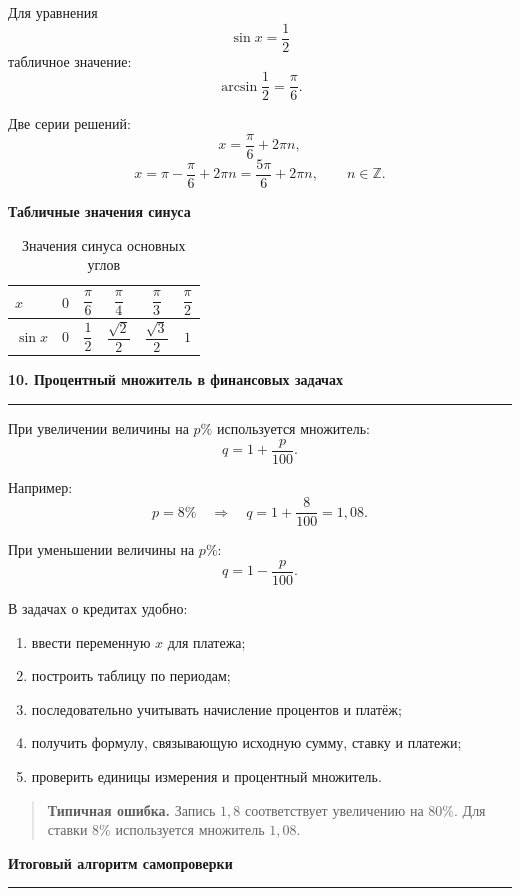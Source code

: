 \documentclass[a4paper,12pt]{article}
\newcommand{\topic}[1]{%
  \par\bigskip
  {\Large\bfseries\color{darkaccent}#1\par}
  \vspace{0.2em}
  {\color{accent}\rule{\linewidth}{0.7pt}}
  \vspace{0.55em}
}
\newcommand{\subtopic}[1]{%
  \par\medskip
  {\large\bfseries\color{darkaccent}#1\par}
  \vspace{0.2em}
}
\newcommand{\warning}[1]{%
  \begin{quote}
    \color{darkaccent}\textbf{Типичная ошибка.}\;
    \color{textgray}#1
  \end{quote}
}
\begin{document}
Для уравнения
\[
\sin x=\frac12
\]
табличное значение:
\[
\arcsin\frac12=\frac\pi6.
\]

Две серии решений:
\[
x=\frac\pi6+2\pi n,
\]
\[
x=\pi-\frac\pi6+2\pi n
=
\frac{5\pi}6+2\pi n,
\qquad n\in\mathbb Z.
\]

\subtopic{Табличные значения синуса}

\begin{table}[htbp]
  \caption{Значения синуса основных углов}
  \centering
  \begin{tabularx}{\linewidth}{@{}Xccccc@{}}
    \toprule
    \(x\) &
    \(0\) &
    \(\dfrac\pi6\) &
    \(\dfrac\pi4\) &
    \(\dfrac\pi3\) &
    \(\dfrac\pi2\) \\
    \midrule
    \(\sin x\) &
    \(0\) &
    \(\dfrac12\) &
    \(\dfrac{\sqrt2}{2}\) &
    \(\dfrac{\sqrt3}{2}\) &
    \(1\) \\
    \bottomrule
  \end{tabularx}
\end{table}

\topic{10. Процентный множитель в финансовых задачах}

При увеличении величины на \(p\%\) используется множитель:
\[
q=1+\frac{p}{100}.
\]

Например:
\[
p=8\%
\quad\Longrightarrow\quad
q=1+\frac8{100}=1,08.
\]

При уменьшении величины на \(p\%\):
\[
q=1-\frac{p}{100}.
\]

В задачах о кредитах удобно:

\begin{enumerate}
  \item ввести переменную \(x\) для платежа;
  \item построить таблицу по периодам;
  \item последовательно учитывать начисление процентов и платёж;
  \item получить формулу, связывающую исходную сумму, ставку и платежи;
  \item проверить единицы измерения и процентный множитель.
\end{enumerate}

\warning{Запись \(1,8\) соответствует увеличению на \(80\%\). Для ставки \(8\%\) используется множитель \(1,08\).}

\topic{Итоговый алгоритм самопроверки}
\end{document}
